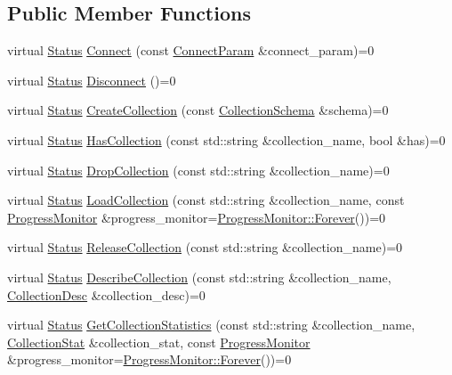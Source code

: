 \subsection*{Public Member Functions}
\begin{DoxyCompactItemize}
\item 
virtual \hyperlink{classmilvus_1_1_status}{Status} \hyperlink{classmilvus_1_1_milvus_client_a617f8dbeb20e2bd3da0736f38927d2bb}{Connect} (const \hyperlink{classmilvus_1_1_connect_param}{Connect\+Param} \&connect\+\_\+param)=0
\item 
virtual \hyperlink{classmilvus_1_1_status}{Status} \hyperlink{classmilvus_1_1_milvus_client_abe131f2af91521e7cac18695470d9e67}{Disconnect} ()=0
\item 
virtual \hyperlink{classmilvus_1_1_status}{Status} \hyperlink{classmilvus_1_1_milvus_client_a437b0a97bd9f7789504fdfeab885b5dd}{Create\+Collection} (const \hyperlink{classmilvus_1_1_collection_schema}{Collection\+Schema} \&schema)=0
\item 
virtual \hyperlink{classmilvus_1_1_status}{Status} \hyperlink{classmilvus_1_1_milvus_client_a2881d16fd038e6d742f7ce4c8a836270}{Has\+Collection} (const std\+::string \&collection\+\_\+name, bool \&has)=0
\item 
virtual \hyperlink{classmilvus_1_1_status}{Status} \hyperlink{classmilvus_1_1_milvus_client_a95855ea21b38da54b65ce04f650b03ba}{Drop\+Collection} (const std\+::string \&collection\+\_\+name)=0
\item 
virtual \hyperlink{classmilvus_1_1_status}{Status} \hyperlink{classmilvus_1_1_milvus_client_a9accafd0369a93ff8e55a6539620ce2f}{Load\+Collection} (const std\+::string \&collection\+\_\+name, const \hyperlink{classmilvus_1_1_progress_monitor}{Progress\+Monitor} \&progress\+\_\+monitor=\hyperlink{classmilvus_1_1_progress_monitor_afad65b07af8419780f2457992ee7ce7d}{Progress\+Monitor\+::\+Forever}())=0
\item 
virtual \hyperlink{classmilvus_1_1_status}{Status} \hyperlink{classmilvus_1_1_milvus_client_aab31131eca6dffbdd9e3257ae9f7f87f}{Release\+Collection} (const std\+::string \&collection\+\_\+name)=0
\item 
virtual \hyperlink{classmilvus_1_1_status}{Status} \hyperlink{classmilvus_1_1_milvus_client_a5bdc7d4afdf9c84b7b50b4a8b4508c6e}{Describe\+Collection} (const std\+::string \&collection\+\_\+name, \hyperlink{classmilvus_1_1_collection_desc}{Collection\+Desc} \&collection\+\_\+desc)=0
\item 
virtual \hyperlink{classmilvus_1_1_status}{Status} \hyperlink{classmilvus_1_1_milvus_client_a0c49e2a5728a70f203118232c16ba47f}{Get\+Collection\+Statistics} (const std\+::string \&collection\+\_\+name, \hyperlink{classmilvus_1_1_collection_stat}{Collection\+Stat} \&collection\+\_\+stat, const \hyperlink{classmilvus_1_1_progress_monitor}{Progress\+Monitor} \&progress\+\_\+monitor=\hyperlink{classmilvus_1_1_progress_monitor_afad65b07af8419780f2457992ee7ce7d}{Progress\+Monitor\+::\+Forever}())=0

\end{DoxyCompactItemize}
